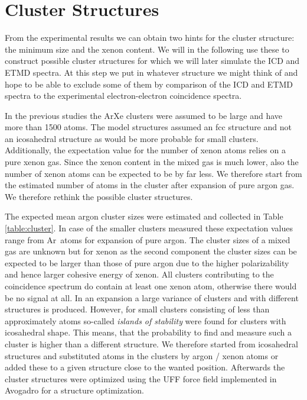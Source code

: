 \section{Cluster Structures}

From the experimental results we can obtain two hints for the cluster
structure: the minimum size and the xenon content. We will in the following
use these to construct possible cluster structures for which we will later
simulate the ICD and ETMD spectra. At this step we put in whatever structure
we might think of and hope to be able to exclude some of them by comparison of
the ICD and ETMD spectra to the experimental electron-electron coincidence
spectra.

In the previous studies \cite{Fasshauer13} the ArXe clusters were assumed
to be large and have more than 1500 atoms. The model structures assumed
an fcc structure and not an icosahedral structure as would be more
probable for small clusters.
Additionally,
the expectation value for the number of xenon atoms relies on a pure
xenon gas. Since the xenon content in the mixed gas is much lower, also
the number of xenon atoms can be expected to be by far less. We therefore
start from the estimated number of atoms in the cluster after expansion
of pure argon gas.
We therefore rethink the possible cluster structures.

The expected mean argon cluster sizes
were estimated and collected in Table \ref{table:cluster}.
In case of the smaller clusters measured
these expectation values range from \unit[3 -- 21]{Ar atoms} for
expansion of pure argon. The cluster sizes of a mixed gas are unknown but
for xenon as the second component the cluster sizes can be expected to
be larger than those of pure argon due to the higher polarizability
and hence larger cohesive energy of xenon. All clusters
contributing to the coincidence spectrum
do contain at least one xenon atom, otherwise there would be no signal at all.
In an expansion a large variance of clusters and with different structures
is produced. However, for small clusters consisting of less than
approximately \unit[1000]{atoms} so-called \emph{islands of stability} were
found for clusters with icosahedral shape. This means, that the probability
to find and measure such a cluster is higher than a different structure.
We therefore started from icosahedral structures and substituted atoms
in the clusters by
argon / xenon atoms or added these to a given structure close to the wanted
position. Afterwards the cluster structures were optimized using the
UFF force field \cite{} implemented in
Avogadro \cite{} for a structure optimization.

